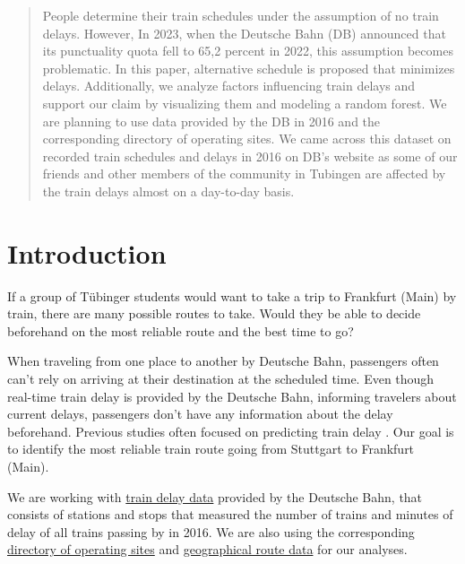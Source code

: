\documentclass{article}
\theoremstyle{plain}
\theoremstyle{definition}
\theoremstyle{remark}
\begin{document}
\printAffiliationsAndNotice{\icmlEqualContribution} %

\begin{abstract}
People determine their train schedules under the assumption of no train delays. However, In 2023, when the Deutsche Bahn (DB) announced that its punctuality quota fell to 65,2 percent in 2022, this assumption becomes problematic. In this paper, alternative schedule is proposed that minimizes delays. Additionally, we analyze factors influencing train delays and support our claim by visualizing them and modeling a random forest. We are planning to use data provided by the DB in 2016 and the corresponding directory of operating sites. We came across this dataset on recorded train schedules and delays in 2016 on DB’s website as some of our friends and other members of the community in Tubingen are affected by the train delays almost on a day-to-day basis. 

\end{abstract}

\section{Introduction}\label{sec:intro}
If a group of Tübinger students would want to take a trip to Frankfurt (Main) by train, there are many possible routes to take. Would they be able to decide beforehand on the most reliable route and the best time to go?

When traveling from one place to another by Deutsche Bahn, passengers often can't rely on arriving at their destination at the scheduled time. Even though real-time train delay is provided by the Deutsche Bahn, informing travelers about current delays, passengers don't have any information about the delay beforehand. Previous studies often focused on predicting train delay \cite{predtraindelay}. Our goal is to identify the most reliable train route going from Stuttgart to Frankfurt (Main).

We are working with \href{https://data.deutschebahn.com/dataset/ist-verkehrsdaten-der-db-cargo-auf-bst8-ebene.html}{train delay data} provided by the Deutsche Bahn, that consists of stations and stops that measured the number of trains and minutes of delay of all trains passing by in 2016. We are also using the corresponding \href{https://data.deutschebahn.com/dataset/betriebsstellen-gueterverkehr.html}{directory of operating sites} and \href{https://data.deutschebahn.com/dataset/betriebsstellen-gueterverkehr.html}{geographical route data} for our analyses.
\end{document}
